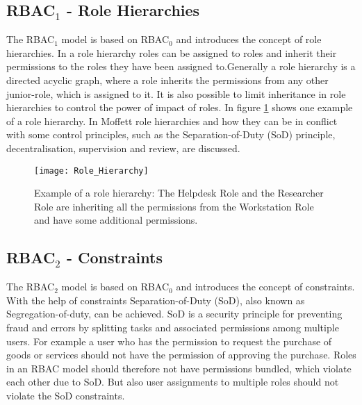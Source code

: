        \subsection{RBAC$_1$ - Role Hierarchies}
        \label{sec:rolehierarchies}
            The RBAC$_1$ model is based on RBAC$_0$ and introduces the concept of role hierarchies. In a role hierarchy roles can be assigned to roles and inherit their permissions to the roles they have been assigned to.\iffalse The role hierarchy can be restricted as a tree or inverted tree, where a role inherits only the permissions of its child-roles, or a partially ordered set, where a role inherits the permissions from any other junior-role, which is assigned to it.\fi Generally a role hierarchy is a directed acyclic graph, where a role inherits the permissions from any other junior-role, which is assigned to it. It is also possible to limit inheritance in role hierarchies to control the power of impact of roles. In figure \ref{fig:rolehierarchies} shows one example of a role hierarchy.
            In Moffett\cite{Moffett:1998} role hierarchies and how they can be in conflict with some control principles, such as the Separation-of-Duty (SoD) principle, decentralisation, supervision and review, are discussed.
            \begin{figure}[H]
                \centering
                \texttt{[image: Role\_Hierarchy]}
                \caption{Example of a role hierarchy: The Helpdesk Role and the Researcher Role are inheriting all the permissions from the Workstation Role and have some additional permissions.}
                \label{fig:rolehierarchies}
            \end{figure}
        \subsection{RBAC$_2$ - Constraints}
        \label{sec:rbac2}
            The RBAC$_2$ model is based on RBAC$_0$ and introduces the concept of constraints. With the help of constraints Separation-of-Duty (SoD), also known as Segregation-of-duty, can be achieved. SoD is a security principle for preventing fraud and errors by splitting tasks and associated permissions among multiple users. For example a user who has the permission to request the purchase of goods or services should not have the permission of approving the purchase. Roles in an RBAC model should therefore not have permissions bundled, which violate each other due to SoD. But also user assignments to multiple roles should not violate the SoD constraints.
